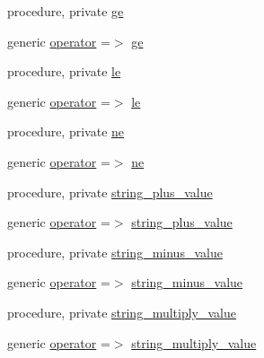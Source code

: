 \begin{DoxyCompactItemize}
\item 
procedure, private \mbox{\hyperlink{structm__strings__oop_1_1string_a92181b235662baf8acf9489585c2dd53}{ge}}
\item 
generic \mbox{\hyperlink{structm__strings__oop_1_1string_a0ec9416af2c9677346cebade8a22187f}{operator}} =$>$ \mbox{\hyperlink{structm__strings__oop_1_1string_a92181b235662baf8acf9489585c2dd53}{ge}}
\item 
procedure, private \mbox{\hyperlink{structm__strings__oop_1_1string_a1ce3592f3269bc49ddfffc4cb7dc735a}{le}}
\item 
generic \mbox{\hyperlink{structm__strings__oop_1_1string_ac18c4ae9c5afc0f832e18718a03dedab}{operator}} =$>$ \mbox{\hyperlink{structm__strings__oop_1_1string_a1ce3592f3269bc49ddfffc4cb7dc735a}{le}}
\item 
procedure, private \mbox{\hyperlink{structm__strings__oop_1_1string_a290aa120fcc23535f04d2effa01b6e7e}{ne}}
\item 
generic \mbox{\hyperlink{structm__strings__oop_1_1string_a1e081318a04d087b5482edb5ef33ad20}{operator}} =$>$ \mbox{\hyperlink{structm__strings__oop_1_1string_a290aa120fcc23535f04d2effa01b6e7e}{ne}}
\item 
procedure, private \mbox{\hyperlink{structm__strings__oop_1_1string_aa5b3201c931867aebff5d6050f65daaa}{string\+\_\+plus\+\_\+value}}
\item 
generic \mbox{\hyperlink{structm__strings__oop_1_1string_a4fc177a34f239d217be25f6e52e60583}{operator}} =$>$ \mbox{\hyperlink{structm__strings__oop_1_1string_aa5b3201c931867aebff5d6050f65daaa}{string\+\_\+plus\+\_\+value}}
\item 
procedure, private \mbox{\hyperlink{structm__strings__oop_1_1string_a94970c8a39e025ffffb7cdb87621500e}{string\+\_\+minus\+\_\+value}}
\item 
generic \mbox{\hyperlink{structm__strings__oop_1_1string_a4e78105db2bb68c2783dae2e9242030d}{operator}} =$>$ \mbox{\hyperlink{structm__strings__oop_1_1string_a94970c8a39e025ffffb7cdb87621500e}{string\+\_\+minus\+\_\+value}}
\item 
procedure, private \mbox{\hyperlink{structm__strings__oop_1_1string_ac7200a6f9e721f1bc28922c8262523f0}{string\+\_\+multiply\+\_\+value}}
\item 
generic \mbox{\hyperlink{structm__strings__oop_1_1string_af7cc8956f9ca20d06617dac98ceb15dd}{operator}} =$>$ \mbox{\hyperlink{structm__strings__oop_1_1string_ac7200a6f9e721f1bc28922c8262523f0}{string\+\_\+multiply\+\_\+value}}
\item 

\end{DoxyCompactItemize}
